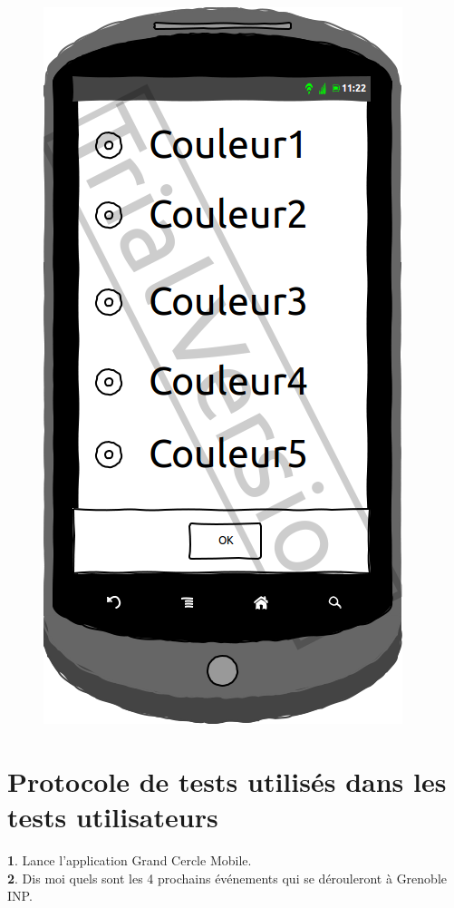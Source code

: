 \documentclass[a4paper, 11px]{article}
\begin{document}
\begin{figure}[htbp]
\begin{minipage}[c]{.32\linewidth}
\begin{center}
			\includegraphics[scale=0.3]{../../Sketch/Android/Design.png}
		\end{center}
	\end{minipage}
\end{figure}
\vfill
\clearpage

\section{Protocole de tests utilisés dans les tests utilisateurs}
\label{protocole}

\textbf{1}. Lance l’application Grand Cercle Mobile.	
\\

\textbf{2}. Dis moi quels sont les 4 prochains événements qui se dérouleront  à Grenoble INP.	
\\
\end{document}
